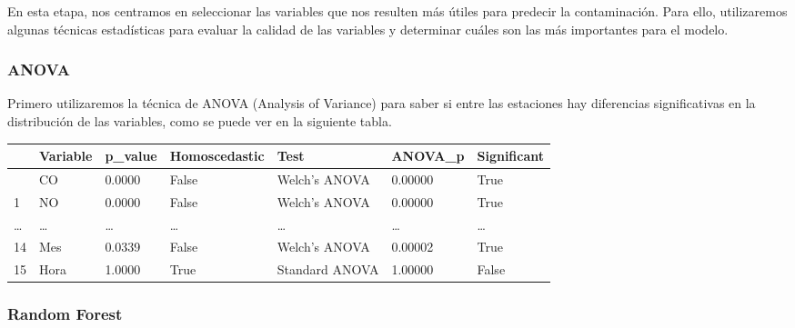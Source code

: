 \documentclass[
  11pt,
  letterpaper,
]{article}
\newcounter{none} %
\begin{document}
En esta etapa, nos centramos en seleccionar las variables que nos
resulten más útiles para predecir la contaminación. Para ello,
utilizaremos algunas técnicas estadísticas para evaluar la calidad de
las variables y determinar cuáles son las más importantes para el
modelo.

\subsubsection{ANOVA}\label{anova}

Primero utilizaremos la técnica de ANOVA (Analysis of Variance) para
saber si entre las estaciones hay diferencias significativas en la
distribución de las variables, como se puede ver en la siguiente tabla.
\cite{fast1998meteorological}

{\def\LTcaptype{none} %
\begin{longtable}[]{@{}lllllll@{}}
\toprule\noalign{}
& Variable & p\_value & Homoscedastic & Test & ANOVA\_p & Significant \\
\midrule\noalign{}
\endhead
\bottomrule\noalign{}
\endlastfoot
0 & CO & 0.0000 & False & Welch's ANOVA & 0.00000 & True \\
1 & NO & 0.0000 & False & Welch's ANOVA & 0.00000 & True \\
\ldots{} & \ldots{} & \ldots{} & \ldots{} & \ldots{} & \ldots{} &
\ldots{} \\
14 & Mes & 0.0339 & False & Welch's ANOVA & 0.00002 & True \\
15 & Hora & 1.0000 & True & Standard ANOVA & 1.00000 & False \\
\end{longtable}
}

\subsubsection{Random Forest}\label{random-forest}
\end{document}
